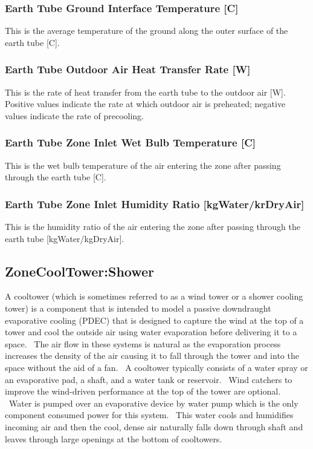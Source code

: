 \subsubsection{Earth Tube Ground Interface Temperature {[}C{]}}\label{earth-tube-ground-interface-temperature-c}

This is the average temperature of the ground along the outer surface of the earth tube {[}C{]}.

\subsubsection{Earth Tube Outdoor Air Heat Transfer Rate {[}W{]}}\label{earth-tube-outdoor-air-heat-transfer-rate-w}

This is the rate of heat transfer from the earth tube to the outdoor air {[}W{]}.~ Positive values indicate the rate at which outdoor air is preheated; negative values indicate the rate of precooling.

\subsubsection{Earth Tube Zone Inlet Wet Bulb Temperature {[}C{]}}\label{earth-tube-zone-inlet-wet-bulb-temperature-c}

This is the wet bulb temperature of the air entering the zone after passing through the earth tube {[}C{]}.

\subsubsection{Earth Tube Zone Inlet Humidity Ratio {[}kgWater/krDryAir{]}}\label{earth-tube-zone-inlet-humidity-ratio-kgWater/kgDryAir}

This is the humidity ratio of the air entering the zone after passing through the earth tube {[}kgWater/kgDryAir{]}.

\subsection{ZoneCoolTower:Shower}\label{zonecooltowershower}

A cooltower (which is sometimes referred to as a wind tower or a shower cooling tower) is a component that is intended to model a passive downdraught evaporative cooling (PDEC) that is designed to capture the wind at the top of a tower and cool the outside air using water evaporation before delivering it to a space.~ The air flow in these systems is natural as the evaporation process increases the density of the air causing it to fall through the tower and into the space without the aid of a fan. ~A cooltower typically consists of a water spray or an evaporative pad, a shaft, and a water tank or reservoir. ~Wind catchers to improve the wind-driven performance at the top of the tower are optional. ~Water is pumped over an evaporative device by water pump which is the only component consumed power for this system.~ This water cools and humidifies incoming air and then the cool, dense air naturally falls down through shaft and leaves through large openings at the bottom of cooltowers.

